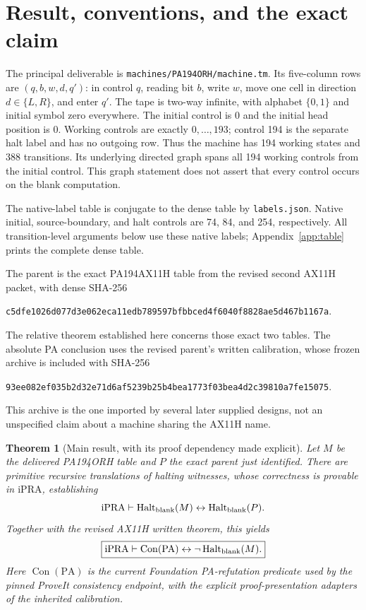 \documentclass[11pt,a4paper]{article}
\newtheorem{theorem}{Theorem}[section]
\theoremstyle{definition}
\newcommand{\ipra}{\mathrm{iPRA}}
\newcommand{\PA}{\mathrm{PA}}
\newcommand{\Con}{\operatorname{Con}}
\newcommand{\Halt}{\operatorname{Halt}}
\newcommand{\file}[1]{\nolinkurl{#1}}
\begin{document}
\section{Result, conventions, and the exact claim}

The principal deliverable is \file{machines/PA194ORH/machine.tm}.
Its five-column rows are $(q,b,w,d,q')$: in control $q$, reading bit $b$,
write $w$, move one cell in direction $d\in\{L,R\}$, and enter $q'$.
The tape is two-way infinite, with alphabet $\{0,1\}$ and initial symbol
zero everywhere. The initial control is 0 and the initial head position
is 0. Working controls are exactly $0,\ldots,193$; control 194 is the
separate halt label and has no outgoing row. Thus the machine has 194
working states and 388 transitions. Its underlying directed graph spans
all 194 working controls from the initial control. This graph statement
does not assert that every control occurs on the blank computation.

The native-label table is conjugate to the dense table by
\file{labels.json}. Native initial, source-boundary, and halt controls
are 74, 84, and 254, respectively. All transition-level arguments below
use these native labels; Appendix~\ref{app:table} prints the complete
dense table.

The parent is the exact PA194AX11H table from the revised second AX11H
packet, with dense SHA-256
\begin{center}\small
\nolinkurl{c5dfe1026d077d3e062eca11edb789597bfbbced4f6040f8828ae5d467b1167a}.
\end{center}
The relative theorem established here concerns those exact two tables.
The absolute PA conclusion uses the revised parent's written calibration,
whose frozen archive is included with SHA-256
\begin{center}\small
\nolinkurl{93ee082ef035b2d32e71d6af5239b25b4bea1773f03bea4d2c39810a7fe15075}.
\end{center}
This archive is the one imported by several later supplied designs, not
an unspecified claim about a machine sharing the AX11H name.

\begin{theorem}[Main result, with its proof dependency made explicit]
Let $M$ be the delivered PA194ORH table and $P$ the exact parent just
identified. There are primitive recursive translations of halting witnesses,
whose correctness is provable in $\ipra$, establishing
\[
 \ipra\vdash\Halt_{\rm blank}(M)\leftrightarrow\Halt_{\rm blank}(P).
\]
Together with the revised AX11H written theorem, this yields
\[
 \boxed{\ipra\vdash\Con(\PA)\leftrightarrow
                     \neg\Halt_{\rm blank}(M).}
\]
Here $\Con(\PA)$ is the current Foundation PA-refutation predicate
used by the pinned ProveIt consistency endpoint, with the explicit
proof-presentation adapters of the inherited calibration.
\end{theorem}
\end{document}
